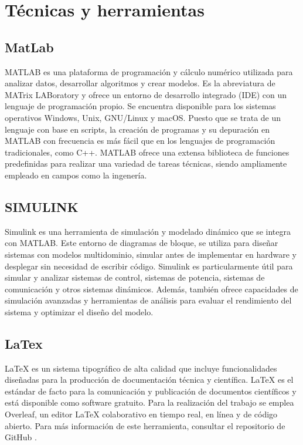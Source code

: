 \section{Técnicas y herramientas}

\subsection{MatLab}
MATLAB \cite{matlab2021matlab} es una plataforma de programación y cálculo numérico utilizada para analizar datos, desarrollar algoritmos y crear modelos. Es la abreviatura de MATrix LABoratory y ofrece un entorno de desarrollo integrado (IDE) con un lenguaje de programación propio. Se encuentra disponible para los sistemas operativos Windows, Unix, GNU/Linux y macOS. Puesto que se trata de un lenguaje con base en scripts, la creación de programas y su depuración en MATLAB con frecuencia es más fácil que en los lenguajes de programación tradicionales, como C++. MATLAB ofrece una extensa biblioteca de funciones predefinidas para realizar una variedad de tareas técnicas, siendo ampliamente empleado en campos como la ingenería.
\subsection{SIMULINK}

Simulink es una herramienta de simulación y modelado dinámico que se integra con MATLAB. Este entorno de diagramas de bloque, se utiliza para diseñar sistemas con modelos multidominio, simular antes de implementar en hardware y desplegar sin necesidad de escribir código. Simulink es particularmente útil para simular y analizar sistemas de control, sistemas de potencia, sistemas de comunicación y otros sistemas dinámicos. Además,  también ofrece capacidades de simulación avanzadas y herramientas de análisis para evaluar el rendimiento del sistema y optimizar el diseño del modelo.

\subsection{LaTex}
LaTeX \cite{latexweb} es un sistema tipográfico de alta calidad que incluye funcionalidades diseñadas para la producción de documentación técnica y científica. LaTeX es el estándar de facto para la comunicación y publicación de documentos científicos y está disponible como software gratuito. Para la realización del trabajo se emplea Overleaf, un editor LaTeX colaborativo en tiempo real, en línea y de código abierto. Para más información de este herramienta, consultar el repositorio de GitHub  \cite{overleafgithub}.


